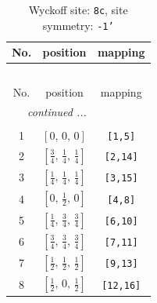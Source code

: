 \documentclass[fleqn,8pt]{jsarticle}
\begin{document}
\renewcommand{\arraystretch}{1.2}
\begin{longtable}{ccc}
\caption{Wyckoff site: {\tt 8c}, site symmetry: {\tt -1'}}
 \\
 \hline \hline
No. & position & mapping \\ \hline \endfirsthead

\multicolumn{2}{l}{\tablename\ \thetable{}} \\
 \hline \hline
No. & position & mapping \\ \hline \endhead

 \hline \hline
\multicolumn{2}{r}{\footnotesize\it continued ...} \\ \endfoot

 \hline \hline
\multicolumn{2}{r}{} \\ \endlastfoot

1 & $\left[ 0,\, 0,\, 0 \right]$ & {\tt [1,5]} \\ \hline
2 & $\left[ \frac{3}{4},\, \frac{1}{4},\, \frac{1}{4} \right]$ & {\tt [2,14]} \\ \hline
3 & $\left[ \frac{1}{4},\, \frac{1}{4},\, \frac{1}{4} \right]$ & {\tt [3,15]} \\ \hline
4 & $\left[ 0,\, \frac{1}{2},\, 0 \right]$ & {\tt [4,8]} \\ \hline
5 & $\left[ \frac{1}{4},\, \frac{3}{4},\, \frac{3}{4} \right]$ & {\tt [6,10]} \\ \hline
6 & $\left[ \frac{3}{4},\, \frac{3}{4},\, \frac{3}{4} \right]$ & {\tt [7,11]} \\ \hline
7 & $\left[ \frac{1}{2},\, \frac{1}{2},\, \frac{1}{2} \right]$ & {\tt [9,13]} \\ \hline
8 & $\left[ \frac{1}{2},\, 0,\, \frac{1}{2} \right]$ & {\tt [12,16]} \\
\end{longtable}
\renewcommand{\arraystretch}{1.2}
\end{document}
